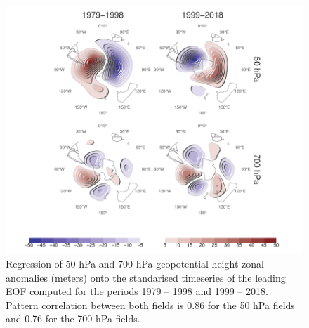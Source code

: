 \documentclass[smallextended]{svjour3}       %
\begin{document}
\begin{figure}
\includegraphics{A6-1} \caption{Regression of 50 hPa and 700 hPa geopotential height zonal anomalies (meters) onto the standarised timeseries of the leading EOF computed for the periods 1979 -- 1998 and 1999 -- 2018. Pattern correlation between both fields is 0.86 for the 50 hPa fields and 0.76 for the 700 hPa fields.}\label{fig:A6}
\end{figure}

\newpage



\end{document}
